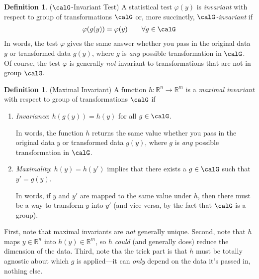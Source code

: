 \documentclass[12pt]{article}
\theoremstyle{plain}
\theoremstyle{definition}
\newtheorem{defn}[thm]{Definition}
\theoremstyle{remark}
\newcommand{\ra}{\rightarrow}
\newcommand{\Rn}{\mathbb{R}^n}
\newcommand{\Rm}{\mathbb{R}^m}
\begin{document}
\begin{defn}($\calG$-Invariant Test)
A statistical test $\varphi(y)$ is \emph{invariant} with respect to
group of transformations $\calG$ or, more succinctly,
\emph{$\calG$-invariant} if
\begin{align*}
  \varphi(g(y))
  = \varphi(y)
  \qquad\forall g\in\calG
\end{align*}
In words, the test $\varphi$ gives the same answer whether you pass in
the original data $y$ or transformed data $g(y)$, where $g$ is
\emph{any} possible transformation in $\calG$.
Of course, the test $\varphi$ is generally \emph{not} invariant to
transformations that are not in group $\calG$.
\end{defn}


\begin{defn}(Maximal Invariant)
A function $h:\Rn\ra\Rm$ is a \emph{maximal invariant} with respect to
group of transformations $\calG$ if
\begin{enumerate}[label=(\roman*)]
  \item \emph{Invariance}: $h(g(y))=h(y)$ for all $g\in\calG$.

    In words, the function $h$ returns the same value whether you pass
    in the original data $y$ or transformed data $g(y)$, where $g$ is
    \emph{any} possible transformation in $\calG$.
  \item \emph{Maximality}:
    $h(y)=h(y')$ implies that there exists a $g\in\calG$
    such that $y'=g(y)$.

    In words, if $y$ and $y'$ are mapped to the same value under $h$,
    then there must be a way to transform $y$ into $y'$ (and vice versa,
    by the fact that $\calG$ is a group).
\end{enumerate}
First, note that maximal invariants are \emph{not} generally unique.
Second, note that $h$ maps $y\in\Rn$ into $h(y)\in\Rm$, so
$h$ \emph{could} (and generally does) reduce the dimension of the data.
Third, note tha the trick part is that $h$ must be totally agnostic
about which $g$ is applied---it can \emph{only} depend on the data it's
passed in, nothing else.
\end{defn}
\end{document}

